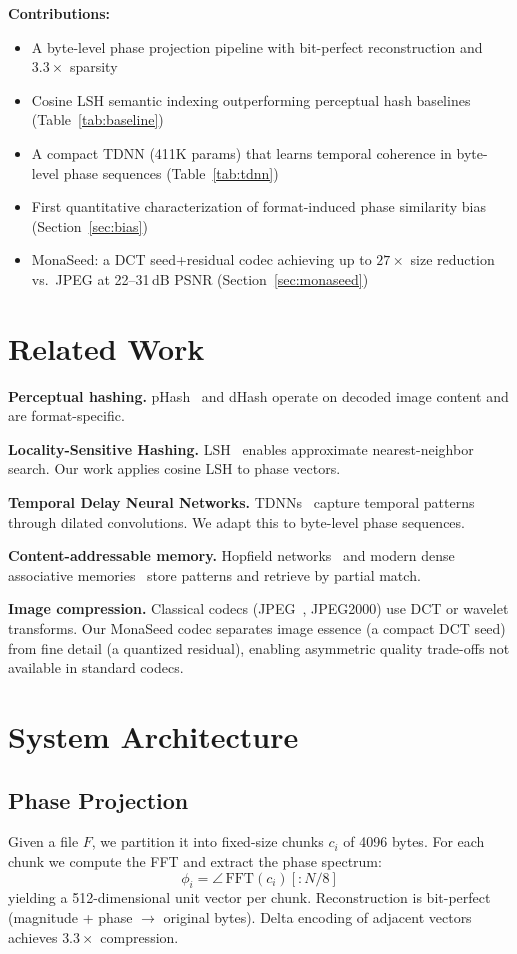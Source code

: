\documentclass[10pt,twocolumn]{article}
\begin{document}
\noindent\textbf{Contributions:}
\begin{itemize}\setlength{\itemsep}{0pt}
\item A byte-level phase projection pipeline with bit-perfect reconstruction
  and $3.3\times$ sparsity
\item Cosine LSH semantic indexing outperforming perceptual hash baselines
  (Table~\ref{tab:baseline})
\item A compact TDNN (411K params) that learns temporal coherence in
  byte-level phase sequences (Table~\ref{tab:tdnn})
\item First quantitative characterization of format-induced phase similarity
  bias (Section~\ref{sec:bias})
\item MonaSeed: a DCT seed+residual codec achieving up to $27\times$ size
  reduction vs.\ JPEG at 22--31\,dB PSNR (Section~\ref{sec:monaseed})
\end{itemize}

\section{Related Work}
\textbf{Perceptual hashing.} pHash~\cite{zauner2010} and dHash operate on
decoded image content and are format-specific.

\textbf{Locality-Sensitive Hashing.} LSH~\cite{indyk1998} enables
approximate nearest-neighbor search. Our work applies cosine LSH to phase
vectors.

\textbf{Temporal Delay Neural Networks.} TDNNs~\cite{waibel1989} capture
temporal patterns through dilated convolutions. We adapt this to byte-level
phase sequences.

\textbf{Content-addressable memory.} Hopfield networks~\cite{hopfield1982}
and modern dense associative memories~\cite{ramsauer2020} store patterns and
retrieve by partial match.

\textbf{Image compression.} Classical codecs (JPEG~\cite{wallace1992},
JPEG2000) use DCT or wavelet transforms. Our MonaSeed codec separates image
essence (a compact DCT seed) from fine detail (a quantized residual),
enabling asymmetric quality trade-offs not available in standard codecs.

\section{System Architecture}

\subsection{Phase Projection}
Given a file $F$, we partition it into fixed-size chunks $c_i$ of 4096 bytes.
For each chunk we compute the FFT and extract the phase spectrum:
$$\phi_i = \angle\,\text{FFT}(c_i)[:N/8]$$
yielding a 512-dimensional unit vector per chunk. Reconstruction is
bit-perfect (magnitude + phase $\rightarrow$ original bytes). Delta encoding
of adjacent vectors achieves $3.3\times$ compression.
\end{document}
